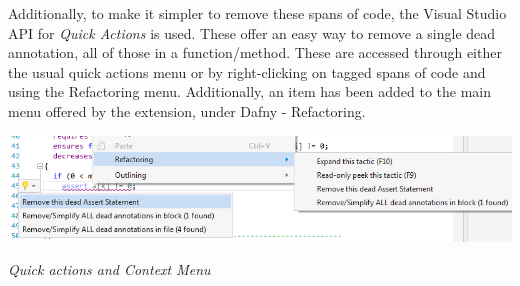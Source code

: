 \documentclass[a4paper]{article}
\begin{document}
Additionally, to make it simpler to remove these spans of code, the Visual Studio API for \textit{Quick Actions} is used. These offer an easy way to remove a single dead annotation, all of those in a function/method. These are accessed through either the usual quick actions menu or by right-clicking on tagged spans of code and using the Refactoring menu. Additionally, an item has been added to the main menu offered by the extension, under Dafny - Refactoring.\par

\begin{centering}
\vspace{0.5cm}
\includegraphics[scale=0.5]{qa_ctxt_3.png}\par
\textit{Quick actions and Context Menu}\par
\vspace{0.5cm}
\end{centering}
\end{document}
